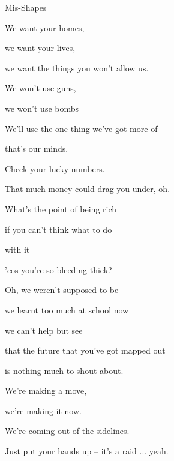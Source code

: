 \begin{song}{Mis-Shapes}{

    \chordset[Verse]{ \AMaj \EMaj \Fshm \DMaj \DSeven}

    \chordset[Chorus]{ \GMaj \GMajSeven \GSeven \CMaj \CMajSeven \CSeven }
	
	\chordset{ \Em \EmSix \EmaddC }

}
\begin{songverse}
		We want your homes,

		we want your lives,

		we want the things you won't allow us. 

		We won't use guns, 

		we won't use bombs

		We'll use the one thing we've got more of --

		that's our minds.  \hspace{30pt}  \hspace{20pt} 

	\end{songverse}

	\begin{songverse}

		 Check your lucky numbers.

		That much money could drag you under, oh. 

		What's the point of being rich 

		if you can't think what to do 
		
		with it 

		'cos you're so bleeding thick?

	\end{songverse}

	\begin{songverse}

		
		 Oh, we weren't supposed to be -- 

		we learnt too much at school now 

		 we can't help but see 

		that the future that you've got mapped out 

		is  nothing much to shout about. 

	\end{songverse}

	\begin{songverse}

		
		 \quad We're making a move, 

		we're making it now. 

		We're coming out of the sidelines. 

		\quad Just put your hands up -- it's a raid ... yeah.


\end{songverse}
\end{song}
